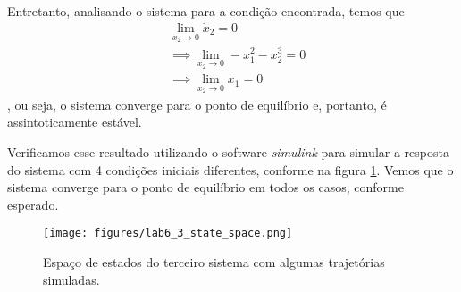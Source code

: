 \documentclass[a4paper]{report}
\begin{document}
Entretanto, analisando o sistema para a condição encontrada, temos que
\begin{align*}
& \lim_{x_2 \to 0} \dot{x}_2 = 0 \\
& \implies \lim_{x_2 \to 0} -x_1^2 - x_2^{3} = 0 \\
& \implies \lim_{x_2 \to 0} x_1 = 0
\end{align*}
, ou seja, o sistema converge para o ponto de equilíbrio e, portanto, é assintoticamente estável.

Verificamos esse resultado utilizando o software \emph{simulink} para simular a resposta do sistema com 4 condições iniciais diferentes, conforme na figura \ref{fig:figures-lab6_3_pplane-png}. Vemos que o sistema converge para o ponto de equilíbrio em todos os casos, conforme esperado.

\begin{figure}[H]
    \centering
    \texttt{[image: figures/lab6\_3\_state\_space.png]}
    \caption{Espaço de estados do terceiro sistema com algumas trajetórias simuladas.}
    \label{fig:figures-lab6_3_pplane-png}
\end{figure}
\end{document}
